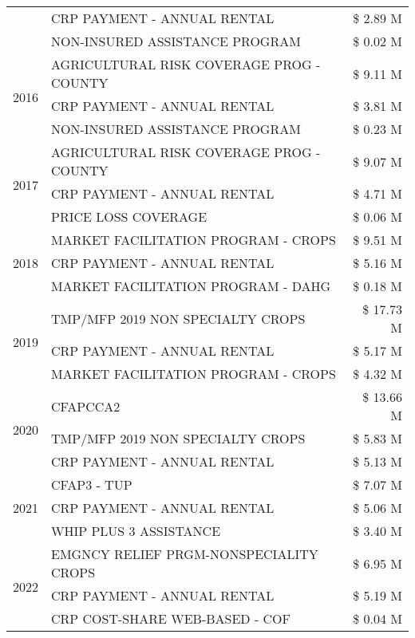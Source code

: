 \begin{tabular}{llr}
 & CRP PAYMENT - ANNUAL RENTAL & \$ 2.89 M \\
 & NON-INSURED ASSISTANCE PROGRAM & \$ 0.02 M \\
\cline{1-3}
\multirow[t]{3}{*}{2016} & AGRICULTURAL RISK COVERAGE PROG - COUNTY & \$ 9.11 M \\
 & CRP PAYMENT - ANNUAL RENTAL & \$ 3.81 M \\
 & NON-INSURED ASSISTANCE PROGRAM & \$ 0.23 M \\
\cline{1-3}
\multirow[t]{3}{*}{2017} & AGRICULTURAL RISK COVERAGE PROG - COUNTY & \$ 9.07 M \\
 & CRP PAYMENT - ANNUAL RENTAL & \$ 4.71 M \\
 & PRICE LOSS COVERAGE & \$ 0.06 M \\
\cline{1-3}
\multirow[t]{3}{*}{2018} & MARKET FACILITATION PROGRAM - CROPS & \$ 9.51 M \\
 & CRP PAYMENT - ANNUAL RENTAL & \$ 5.16 M \\
 & MARKET FACILITATION PROGRAM - DAHG & \$ 0.18 M \\
\cline{1-3}
\multirow[t]{3}{*}{2019} & TMP/MFP 2019 NON SPECIALTY CROPS & \$ 17.73 M \\
 & CRP PAYMENT - ANNUAL RENTAL & \$ 5.17 M \\
 & MARKET FACILITATION PROGRAM - CROPS & \$ 4.32 M \\
\cline{1-3}
\multirow[t]{3}{*}{2020} & CFAPCCA2 & \$ 13.66 M \\
 & TMP/MFP 2019 NON SPECIALTY CROPS & \$ 5.83 M \\
 & CRP PAYMENT - ANNUAL RENTAL & \$ 5.13 M \\
\cline{1-3}
\multirow[t]{3}{*}{2021} & CFAP3 - TUP & \$ 7.07 M \\
 & CRP PAYMENT - ANNUAL RENTAL & \$ 5.06 M \\
 & WHIP PLUS 3 ASSISTANCE & \$ 3.40 M \\
\cline{1-3}
\multirow[t]{3}{*}{2022} & EMGNCY RELIEF PRGM-NONSPECIALITY CROPS & \$ 6.95 M \\
 & CRP PAYMENT - ANNUAL RENTAL & \$ 5.19 M \\
 & CRP COST-SHARE WEB-BASED - COF & \$ 0.04 M \\
\cline{1-3}
\bottomrule
\end{tabular}
